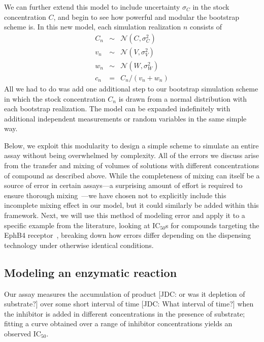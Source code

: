 \documentclass[aps,pre,twocolumn,nofootinbib,superscriptaddress,linenumbers]{revtex4-1}
\begin{document}
We can further extend this model to include uncertainty $\sigma_C$ in the stock concentration $C$, and begin to see how powerful and modular the bootstrap scheme is.
In this new model, each simulation realization $n$ consists of
\begin{eqnarray}
C_n &\sim& \mathcal{N}(C, \sigma_C^2) \nonumber \\
v_n &\sim& \mathcal{N}(V, \sigma_V^2) \nonumber \\
w_n &\sim& \mathcal{N}(W, \sigma_W^2) \nonumber \\
c_n &=& C_n / (v_n + w_n)
\end{eqnarray}
All we had to do was add one additional step to our bootstrap simulation scheme in which the stock concentration $C_n$ is drawn from a normal distribution with each bootstrap realization.
The model can be expanded indefinitely with additional independent measurements or random variables in the same simple way.

Below, we exploit this modularity to design a simple scheme to simulate an entire assay without being overwhelmed by complexity.
All of the errors we discuss arise  from the transfer and mixing of volumes of solutions with different concentrations of compound as described above.
While the completeness of mixing can itself be a source of error in certain assays---a surprising amount of effort is required to ensure thorough mixing~\cite{walling_mixing_2007,weiss_modeling_2002,mitre_turbo-mixing_2007}---we have chosen not to explicitly include this incomplete mixing effect in our model, but it could similarly be added within this framework.
Next, we will use this method of modeling error and apply it to a specific example from the literature, looking at IC$_{50}$s for compounds targeting the EphB4 receptor~\cite{ekins_dispensing_2013,barlaam_novel_2009,barlaam_pyrimidine_2010}, breaking down how errors differ depending on the dispensing technology under otherwise identical conditions.

\subsection*{Modeling an enzymatic reaction}

Our assay measures the accumulation of product {\color{red}[JDC: or was it depletion of substrate?]} over some short interval of time  {\color{red}[JDC: What interval of time?]} when the inhibitor is added in different concentrations in the presence of substrate; fitting a curve obtained over a range of inhibitor concentrations yields an observed IC$_{50}$.
\end{document}
